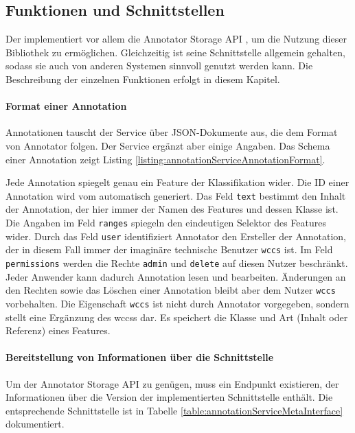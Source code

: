 \subsection{Funktionen und Schnittstellen}
    \label{section:solutionDetailsAnnotationServiceFunctions}
    Der {\annotationService} implementiert vor allem die
    Annotator Storage API \cite[Kapitel "`Storage"']{annotator:documentation},
    um die Nutzung dieser Bibliothek zu ermöglichen.
    Gleichzeitig ist seine Schnittstelle allgemein gehalten,
    sodass sie auch von anderen Systemen sinnvoll genutzt werden kann.
    Die Beschreibung der einzelnen Funktionen erfolgt in diesem Kapitel.

    \paragraph{Format einer Annotation}
    Annotationen tauscht der Service über JSON-Dokumente aus,
    die dem Format von Annotator \cite[Kapitel "`Annotation format"' ]{annotator:documentation} folgen.
    Der Service ergänzt aber einige Angaben.
    Das Schema einer Annotation zeigt Listing \ref{listing:annotationServiceAnnotationFormat}.

    

    Jede Annotation spiegelt genau ein Feature der Klassifikation wider.
    Die ID einer Annotation wird vom {\annotationService} automatisch
    generiert.
    Das Feld \texttt{text} bestimmt den Inhalt der Annotation,
    der hier immer der Namen des Features und dessen Klasse ist.
    Die Angaben im Feld \texttt{ranges} spiegeln den eindeutigen Selektor des Features wider.
    Durch das Feld \texttt{user} identifiziert Annotator den Ersteller der Annotation,
    der in diesem Fall immer der imaginäre technische Benutzer \texttt{wccs} ist.
    Im Feld \texttt{permissions} werden die Rechte \texttt{admin} und \texttt{delete} auf diesen Nutzer beschränkt.
    Jeder Anwender kann dadurch Annotation lesen und bearbeiten.
    Änderungen an den Rechten sowie das Löschen einer Annotation bleibt aber dem Nutzer \texttt{wccs} vorbehalten.
    Die Eigenschaft \texttt{wccs} ist nicht durch Annotator vorgegeben,
    sondern stellt eine Ergänzung des \glspl{wccs} dar.
    Es speichert die Klasse und Art (Inhalt oder Referenz) eines Features.

    \paragraph{Bereitstellung von Informationen über die Schnittstelle}
    Um der Annotator Storage API \cite[Kapitel "`Storage"' ]{annotator:documentation} zu genügen,
    muss ein Endpunkt existieren,
    der Informationen über die Version der implementierten Schnittstelle
    enthält.
    Die entsprechende Schnittstelle ist in Tabelle
    \ref{table:annotationServiceMetaInterface} dokumentiert.

